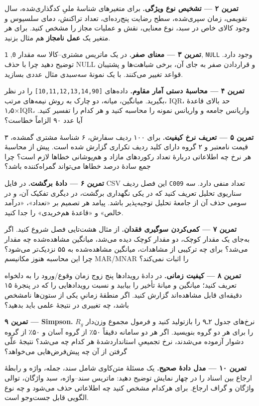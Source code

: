 \documentclass[12pt,a4paper,oneside]{book}
\begin{document}
\textbf{تمرین ۲ --- تشخیص نوع ویژگی.} برای متغیرهای شناسهٔ ملیِ کدگذاری‌شده، سال تقویمی، زمان سپری‌شده، سطح رضایت پنج‌رده‌ای، تعداد تراکنش، دمای سلسیوس و وجود کالای خاص در سبد، نوع معنایی، نقش و عملیات مجاز را مشخص کنید. برای هر متغیر یک \textbf{عمل نامجاز} هم مثال بزنید.

\textbf{تمرین ۳ --- معنای صفر.} در یک ماتریس مشتری--کالا سه مقدار \texttt{0}, \texttt{1}, \texttt{NULL} وجود دارد. توضیح دهید چرا با حذف NULL و قراردادن صفر به جای آن، برخی شباهت‌ها و پشتیبان قواعد تغییر می‌کنند. با یک نمونهٔ سه‌سبدی مثال عددی بسازید.

\textbf{تمرین ۴ --- محاسبهٔ دستی آمار مقاوم.} داده‌های \texttt{{[}10,11,12,13,14,90{]}} را در نظر بگیرید. میانگین، میانه، دو چارک به روش نیمه‌های مرتب، IQR، حد بالای قاعدهٔ ۱٫۵×IQR، واریانس جامعه و واریانس نمونه را محاسبه کنید و هر کدام را تفسیر کنید. آیا عدد ۹۰ الزاماً خطاست؟

\textbf{تمرین ۵ --- تعریف نرخ کیفیت.} برای ۱۰۰ ردیف سفارش، ۶ شناسهٔ مشتری گمشده، ۳ قیمت نامعتبر و ۲ گروه دارای کلید ردیف تکراری گزارش شده است. پیش از محاسبهٔ هر نرخ چه اطلاعاتی دربارهٔ تعداد رکوردهای مازاد و هم‌پوشانی خطاها لازم است؟ چرا جمع سادهٔ درصد خطاها می‌تواند گمراه‌کننده باشد؟

\textbf{تمرین ۶ --- دادهٔ برگشت.} در فایل CSV این فصل ردیف \texttt{C009} تعداد منفی دارد. سه سناریوی تحلیل تعریف کنید که در یکی نگهداری برگشت، در دیگری تفکیک آن، و در سومی حذف آن از جامعهٔ تحلیل توجیه‌پذیر باشد. پیامد هر تصمیم بر «تعداد»، «درآمد خالص» و «قاعدهٔ هم‌خریدی» را جدا کنید.

\textbf{تمرین ۷ --- کمی‌کردن سوگیری فقدان.} از مثال هشت‌تایی فصل شروع کنید. اگر به‌جای یک مقدار کوچک، دو مقدار کوچک دیده می‌شد، میانگین مشاهده‌شده چه مقدار می‌شد؟ برای چه ترکیبی از مشاهدات، میانگین مشاهده‌شده به ۵۵ نزدیک‌تر می‌شود؟ چرا این محاسبه هنوز مکانیسم MAR/MNAR را اثبات نمی‌کند؟

\textbf{تمرین ۸ --- کیفیت زمانی.} در دادهٔ رویدادها پنج زوج زمان وقوع/ورود را به دلخواه تعریف کنید؛ میانگین و میانهٔ تأخیر را بیابید و نسبت رویدادهایی را که در پنجرهٔ ۱۵ دقیقه‌ای قابل مشاهده‌اند گزارش کنید. اگر منطقهٔ زمانیِ یکی از ستون‌ها نامشخص باشد، چه تغییری در نتیجهٔ علمی باید بدهید؟

\textbf{تمرین ۹ --- Simpson.} نرخ‌های جدول ۲ـ۹ را بازتولید کنید و فرمول مجموع وزن‌دار \(R_g\) را برای هر دو گروه بنویسید. اگر هر دو سامانه دقیقاً ۵۰٪ از گروه آسان و ۵۰٪ از گروه دشوار آزموده می‌شدند، نرخ تجمیعیِ استانداردشدهٔ هر کدام چه می‌شد؟ نتیجهٔ علّی گرفتن از آن چه پیش‌فرض‌هایی می‌خواهد؟

\textbf{تمرین ۱۰ --- مدل دادهٔ صحیح.} یک مسئلهٔ متن‌کاوی شامل سند، جمله، واژه و رابطهٔ ارجاع بین اسناد را در چهار نمایش توضیح دهید: ماتریس سند--واژه، سبد واژگان، توالی واژگان و گراف ارجاع. برای هرکدام مشخص کنید چه اطلاعاتی حذف می‌شود و چه نوع الگویی قابل جست‌وجو است.
\end{document}

